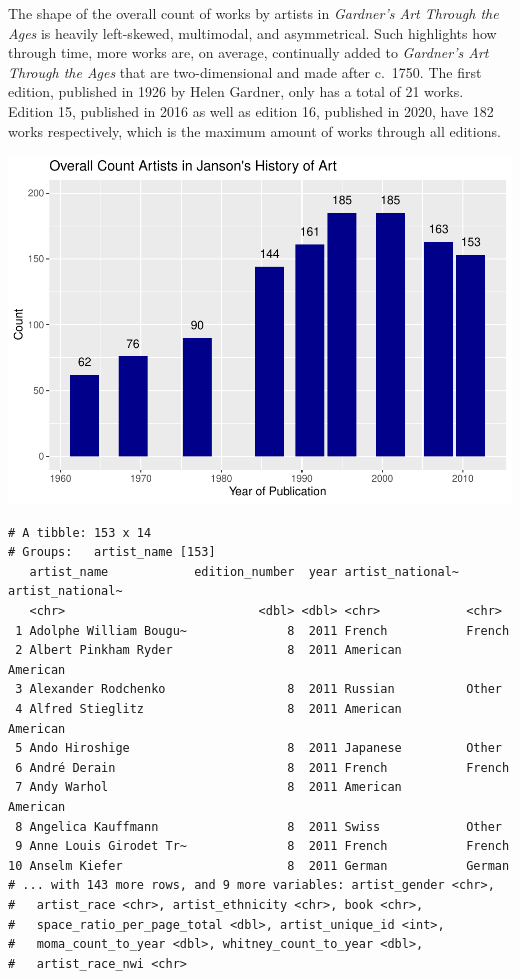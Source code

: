 \documentclass[
  letterpaper,
  DIV=11,
  numbers=noendperiod]{scrreprt}
\begin{document}
The shape of the overall count of works by artists in \emph{Gardner's
Art Through the Ages} is heavily left-skewed, multimodal, and
asymmetrical. Such highlights how through time, more works are, on
average, continually added to \emph{Gardner's Art Through the Ages} that
are two-dimensional and made after c.~1750. The first edition, published
in 1926 by Helen Gardner, only has a total of 21 works. Edition 15,
published in 2016 as well as edition 16, published in 2020, have 182
works respectively, which is the maximum amount of works through all
editions.

\includegraphics{Chapter1/Chapter1_files/figure-pdf/jansoncountthroughtime-1.pdf}

\begin{verbatim}
# A tibble: 153 x 14
# Groups:   artist_name [153]
   artist_name            edition_number  year artist_national~ artist_national~
   <chr>                           <dbl> <dbl> <chr>            <chr>           
 1 Adolphe William Bougu~              8  2011 French           French          
 2 Albert Pinkham Ryder                8  2011 American         American        
 3 Alexander Rodchenko                 8  2011 Russian          Other           
 4 Alfred Stieglitz                    8  2011 American         American        
 5 Ando Hiroshige                      8  2011 Japanese         Other           
 6 André Derain                        8  2011 French           French          
 7 Andy Warhol                         8  2011 American         American        
 8 Angelica Kauffmann                  8  2011 Swiss            Other           
 9 Anne Louis Girodet Tr~              8  2011 French           French          
10 Anselm Kiefer                       8  2011 German           German          
# ... with 143 more rows, and 9 more variables: artist_gender <chr>,
#   artist_race <chr>, artist_ethnicity <chr>, book <chr>,
#   space_ratio_per_page_total <dbl>, artist_unique_id <int>,
#   moma_count_to_year <dbl>, whitney_count_to_year <dbl>,
#   artist_race_nwi <chr>
\end{verbatim}
\end{document}
